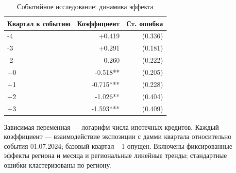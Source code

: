 \begin{table}[htbp]
\centering
\small
\caption{Событийное исследование: динамика эффекта}
\label{tab:event}
\begin{tabular}{lrr}
\toprule
Квартал к событию & Коэффициент & Ст. ошибка \\
\midrule
-4 & +0.419 & (0.336) \\
-3 & +0.291 & (0.181) \\
-2 & -0.260 & (0.222) \\
+0 & -0.518** & (0.205) \\
+1 & -0.715*** & (0.228) \\
+2 & -1.026** & (0.404) \\
+3 & -1.593*** & (0.409) \\
\bottomrule
\end{tabular}
\par\smallskip\begin{minipage}{0.92\textwidth}\footnotesize
Зависимая переменная — логарифм числа ипотечных кредитов. Каждый коэффициент — взаимодействие экспозиции с дамми квартала относительно события 01.07.2024; базовый квартал −1 опущен. Включены фиксированные эффекты региона и месяца и региональные линейные тренды; стандартные ошибки кластеризованы по региону.
\end{minipage}
\end{table}
